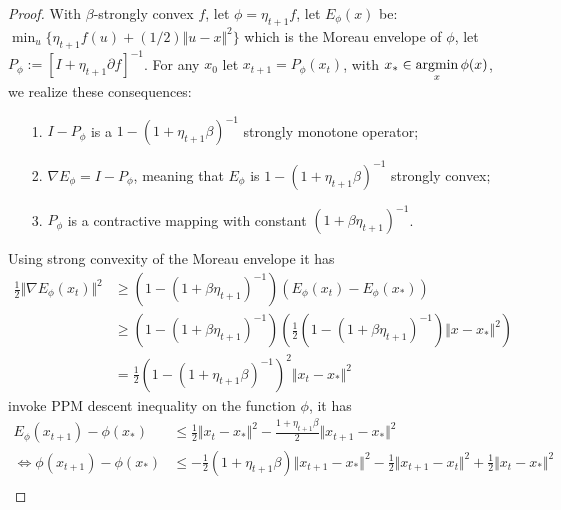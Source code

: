 \documentclass[12pt]{article}
\begin{document}
        \begin{proof}
            With $\beta$-strongly convex $f$, let $\phi = \eta_{t + 1}f$, let $E_\phi(x)$ be: $\min_u \{\eta_{t + 1} f(u) + (1/2)\Vert u - x\Vert^2\}$ which is the Moreau envelope of $\phi$, let $P_\phi := [I + \eta_{t + 1}\partial f]^{-1}$. 
            For any $x_0$ let $x_{t + 1} = P_\phi(x_t)$, with $x_* \in \mathop{\rm argmin}\limits_{x} \phi(x)$, we realize these consequences:
            \begin{enumerate}
                \item [1.] $I - P_\phi$ is a $1 - (1 + \eta_{t + 1}\beta)^{-1}$ strongly monotone operator;
                \item [2.] $\nabla E_\phi = I - P_\phi$, meaning that $E_\phi$ is $1 - (1 + \eta_{t + 1}\beta)^{-1}$ strongly convex;
                \item [3.] $P_\phi$ is a contractive mapping with constant $(1 + \beta\eta_{t + 1})^{-1}$. 
            \end{enumerate}
            Using strong convexity of the Moreau envelope it has 
            \begin{align*}
                \frac{1}{2}\Vert \nabla E_\phi(x_t)\Vert^2 
                &\ge 
                (1 - (1 + \beta\eta_{t + 1})^{-1}) (E_\phi(x_t) - E_\phi(x_*))
                \\
                &\ge 
                (1 - (1 + \beta\eta_{t + 1})^{-1})\left(
                    \frac{1}{2}(1 - (1 + \beta\eta_{t + 1})^{-1})
                    \Vert x - x_*\Vert^2
                \right)
                \\
                &= 
                \frac{1}{2}\left(
                    1 - (1 + \eta_{t + 1}\beta)^{-1}
                \right)^2 \Vert x_t - x_*\Vert^2
            \end{align*}
            invoke PPM descent inequality on the function $\phi$, it has 
            {\footnotesize
            \begin{align*}
                E_\phi(x_{t + 1}) - \phi(x_*) 
                &\le 
                \frac{1}{2}\Vert x_t - x_*\Vert^2 
                -\frac{1 + \eta_{t + 1}\beta}{2}\Vert x_{t + 1} - x_*\Vert^2
                \\
                \iff 
                \phi(x_{t + 1}) - \phi(x_*)
                &\le 
                -\frac{1}{2}(1 + \eta_{t + 1}\beta)\Vert x_{t + 1} - x_*\Vert^2
                - \frac{1}{2}\Vert x_{t + 1} - x_t\Vert^2 
                + \frac{1}{2}\Vert x_t - x_*\Vert^2
                \\

\end{align*}}
\end{proof}
\end{document}
